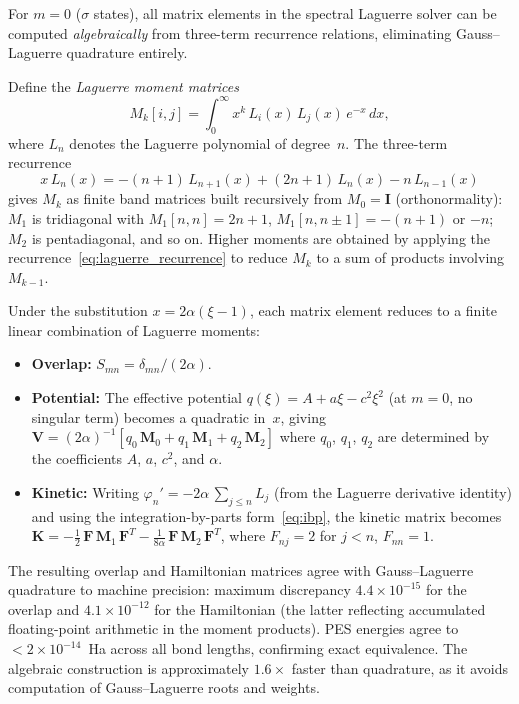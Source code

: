 \documentclass[aps,pra,twocolumn,superscriptaddress,longbibliography]{revtex4-2}
\begin{document}
For $m = 0$ ($\sigma$ states), all matrix elements in the spectral
Laguerre solver can be computed \emph{algebraically} from three-term
recurrence relations, eliminating Gauss--Laguerre quadrature entirely.

Define the \emph{Laguerre moment matrices}
\begin{equation}
  M_k[i,j] = \int_0^\infty x^k\,L_i(x)\,L_j(x)\,e^{-x}\,dx,
  \label{eq:laguerre_moment}
\end{equation}
where $L_n$ denotes the Laguerre polynomial of degree~$n$.
The three-term recurrence
\begin{equation}
  x\,L_n(x) = -(n+1)\,L_{n+1}(x) + (2n+1)\,L_n(x) - n\,L_{n-1}(x)
  \label{eq:laguerre_recurrence}
\end{equation}
gives $M_k$ as finite band matrices built recursively from
$M_0 = \mathbf{I}$ (orthonormality): $M_1$ is tridiagonal with
$M_1[n,n] = 2n+1$, $M_1[n, n\pm 1] = -(n+1)$ or $-n$;
$M_2$ is pentadiagonal, and so on.  Higher moments are obtained by
applying the recurrence~\eqref{eq:laguerre_recurrence} to reduce
$M_k$ to a sum of products involving $M_{k-1}$.

Under the substitution $x = 2\alpha(\xi - 1)$, each matrix element
reduces to a finite linear combination of Laguerre moments:
\begin{itemize}
  \item \textbf{Overlap:} $S_{mn} = \delta_{mn}/(2\alpha)$.
  \item \textbf{Potential:} The effective potential
    $q(\xi) = A + a\xi - c^2\xi^2$ (at $m = 0$, no singular term)
    becomes a quadratic in~$x$, giving
    $\mathbf{V} = (2\alpha)^{-1}[q_0\,\mathbf{M}_0 + q_1\,\mathbf{M}_1
    + q_2\,\mathbf{M}_2]$
    where $q_0$, $q_1$, $q_2$ are determined by the coefficients $A$,
    $a$, $c^2$, and $\alpha$.
  \item \textbf{Kinetic:} Writing $\varphi_n' = -2\alpha\,\sum_{j \le n} L_j$
    (from the Laguerre derivative identity) and using the
    integration-by-parts form~\eqref{eq:ibp}, the kinetic matrix becomes
    $\mathbf{K} = -\tfrac{1}{2}\,\mathbf{F}\,\mathbf{M}_1\,\mathbf{F}^T
    - \tfrac{1}{8\alpha}\,\mathbf{F}\,\mathbf{M}_2\,\mathbf{F}^T$,
    where $F_{nj} = 2$ for $j < n$, $F_{nn} = 1$.
\end{itemize}

The resulting overlap and Hamiltonian matrices agree with
Gauss--Laguerre quadrature to machine precision: maximum discrepancy
$4.4 \times 10^{-15}$ for the overlap and $4.1 \times 10^{-12}$ for the
Hamiltonian (the latter reflecting accumulated floating-point arithmetic
in the moment products).  PES energies agree to $< 2 \times 10^{-14}$~Ha
across all bond lengths, confirming exact equivalence.  The algebraic
construction is approximately $1.6\times$ faster than quadrature,
as it avoids computation of Gauss--Laguerre roots and weights.
\end{document}
